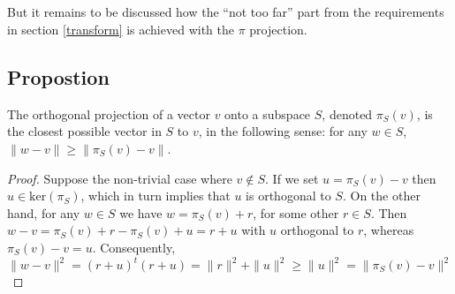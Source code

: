 \documentclass{proc-l}
\theoremstyle{definition}
\theoremstyle{remark}
\numberwithin{equation}{section}
\renewcommand{\ker}[1]{\textrm{ker}({#1})}
\begin{document}
\subsection{}
But it remains to be discussed how the ``not too far'' part from the requirements in section \ref{transform} is achieved with the $\pi$ projection.

\subsection{Propostion}
The orthogonal projection of a vector $v$ onto a subspace $S$, denoted $\pi_S(v)$, is the closest possible vector in $S$ to $v$, in the following sense: for any $w\in S$, $\|w-v\| \geq \|\pi_S(v) - v\|$.

\begin{proof}
\noindent
Suppose the non-trivial case where $v\notin S$. If we set $u=\pi_S(v) - v$ then $u\in\ker{\pi_S}$, which in turn implies that $u$ is orthogonal to $S$. On the other hand, for any $w\in S$ we have $w = \pi_S(v) + r$, for some other $r\in S$. Then $w - v = \pi_S(v) + r - \pi_S(v) + u = r + u$ with $u$ orthogonal to $r$, whereas $\pi_S(v) - v = u$. Consequently,
\[
\|w - v\|^2 = (r + u)^t(r + u) = \|r\|^2 + \|u\|^2 \geq \|u\|^2 = \|\pi_S(v) - v\|^2
\]
\end{proof}




\end{document}
